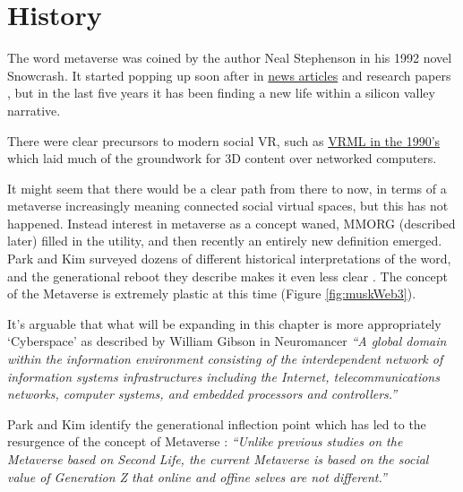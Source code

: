 \section{History}
The word metaverse was coined by the author Neal Stephenson in his 1992 novel Snowcrash. It started popping up soon after in \href{https://www.newscientist.com/article/mg14819994-000-how-to-build-a-metaverse/}{news articles} and research papers \cite{mclellan1993avatars}, but in the last five years it has been finding a new life within a silicon valley narrative.\par
There were clear precursors to modern social VR, such as \href{https://www.howtogeek.com/778554/remembering-vrml-the-metaverse-of-1995/}{VRML in the 1990's} which laid much of the groundwork for 3D content over networked computers.\par%
It might seem that there would be a clear path from there to now, in terms of a metaverse increasingly meaning connected social virtual spaces, but this has not happened. Instead interest in metaverse as a concept waned, MMORG (described later) filled in the utility, and then recently an entirely new definition emerged. Park and Kim surveyed dozens of different historical interpretations of the word, and the generational reboot they describe makes it even less clear \cite{park2022metaverse}. The concept of the Metaverse is extremely plastic at this time (Figure \ref{fig:muskWeb3}).\par
It's arguable that what will be expanding in this chapter is more appropriately `Cyberspace' as described by William Gibson in Neuromancer \cite{gibson2019neuromancer} \textit{``A global domain within the information environment consisting of the interdependent network of information systems infrastructures including the Internet, telecommunications networks, computer systems, and embedded processors and controllers.''}\par
Park and Kim identify the generational inflection point which has led to the resurgence of the concept of Metaverse \cite{park2022metaverse}: 
\textit{``Unlike previous studies on the Metaverse based on Second Life, the current Metaverse is based on the social value of Generation Z that online and offine selves are not different.''} \par
